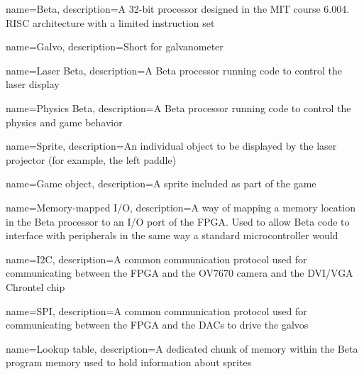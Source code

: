 {
  name=Beta,
  description={A 32-bit processor designed in the MIT course 6.004. RISC architecture with a limited instruction set}
}

{
  name=Galvo,
  description={Short for galvanometer}
}

{
  name=Laser Beta,
  description={A Beta processor running code to control the laser display}
}

{
  name=Physics Beta,
  description={A Beta processor running code to control the physics and game behavior}
}

{
  name=Sprite,
  description={An individual object to be displayed by the laser projector (for example, the left paddle)}
}

{
  name=Game object,
  description={A sprite included as part of the game}
}

{
  name=Memory-mapped I/O,
  description={A way of mapping a memory location in the Beta processor to an I/O port of the FPGA. Used to allow Beta code to interface with peripherals in the same way a standard microcontroller would}
}

{
  name=I2C,
  description={A common communication protocol used for communicating between the FPGA and the OV7670 camera and the DVI/VGA Chrontel chip}
}

{
  name=SPI,
  description={A common communication protocol used for communicating between the FPGA and the DACs to drive the galvos}
}

{
  name=Lookup table,
  description={A dedicated chunk of memory within the Beta program memory used to hold information about sprites}
}
